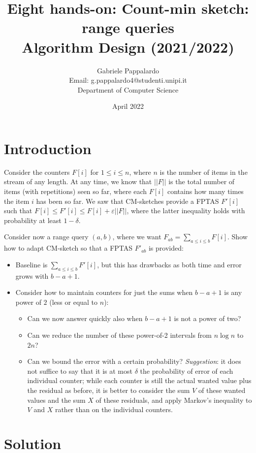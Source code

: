 \documentclass{article}
\title{Eight hands-on: Count-min sketch: range queries\\[1ex] \large Algorithm Design (2021/2022)}
\author{Gabriele Pappalardo\\Email: g.pappalardo4@studenti.unipi.it\\Department of Computer Science}
\date{April 2022}
\begin{document}
\maketitle

\section{Introduction}

Consider the counters $F[i]$ for $1 \le i \le n$, where $n$ is the number of items in the stream of any length. 
At any time, we know that $|| F ||$ is the total number of items (with repetitions) seen so far, where each 
$F[i]$ contains how many times the item $i$ has been so far.  
We saw that CM-sketches provide a FPTAS $F'[i]$ such that $F[i] \le F'[i] \le F[i] + \varepsilon  ||F||$, 
where the latter inequality holds with probability at least $1 - \delta$.\newline

\noindent Consider now a range query $(a,b)$, where we want $F_{ab} = \sum_{a \le i \le b} F[i]$. Show how to adapt CM-sketch so that a FPTAS $F'_{ab}$ is provided: 

\begin{itemize}
    \item Baseline is $\sum_{a \le i \le b} F'[i]$, but this has drawbacks as both time and error grows with $b-a+1$.
    \item Consider how to maintain counters for just the sums when $b-a+1$ is any power of $2$ (less or equal to $n$):
    \begin{itemize}
        \item Can we now answer quickly also when $b-a+1$ is not a power of two? 
        \item Can we reduce the number of these power-of-2 intervals from $n \log n$ to $2n$?
        \item Can we bound the error with a certain probability? \textit{Suggestion}: it does not suffice to say that it is at most $\delta$ 
        the probability of error of each individual counter; while each counter is still the actual wanted value plus the residual as before, 
        it is better to consider the sum $V$ of these wanted values and the sum $X$ of these residuals, and apply Markov’s inequality to $V$ and $X$ 
        rather than on the individual counters.  
    \end{itemize} 
\end{itemize}

\section{Solution}
\end{document}

